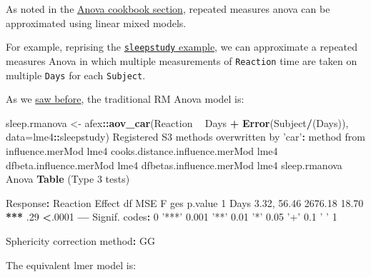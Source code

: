 \documentclass[]{article}
\newenvironment{Shaded}{\begin{snugshade}}{\end{snugshade}}
\newcommand{\DataTypeTok}[1]{\textcolor[rgb]{0.13,0.29,0.53}{#1}}
\newcommand{\DecValTok}[1]{\textcolor[rgb]{0.00,0.00,0.81}{#1}}
\newcommand{\ErrorTok}[1]{\textcolor[rgb]{0.64,0.00,0.00}{\textbf{#1}}}
\newcommand{\FloatTok}[1]{\textcolor[rgb]{0.00,0.00,0.81}{#1}}
\newcommand{\KeywordTok}[1]{\textcolor[rgb]{0.13,0.29,0.53}{\textbf{#1}}}
\newcommand{\NormalTok}[1]{#1}
\newcommand{\OperatorTok}[1]{\textcolor[rgb]{0.81,0.36,0.00}{\textbf{#1}}}
\newcommand{\StringTok}[1]{\textcolor[rgb]{0.31,0.60,0.02}{#1}}
\begin{document}
As noted in the \href{anova-cookbook.html}{Anova cookbook section}, repeated measures
anova can be approximated using linear mixed models.

For example, reprising the \protect\hyperlink{sleepstudy-rmanova}{\texttt{sleepstudy} example}, we can
approximate a repeated measures Anova in which multiple measurements of
\texttt{Reaction} time are taken on multiple \texttt{Days} for each \texttt{Subject}.

As we \protect\hyperlink{sleepstudy-rmanova}{saw before}, the traditional RM Anova model is:

\begin{Shaded}
\begin{Highlighting}[]
\NormalTok{sleep.rmanova <-}\StringTok{ }\NormalTok{afex}\OperatorTok{::}\KeywordTok{aov_car}\NormalTok{(Reaction }\OperatorTok{~}\StringTok{ }\NormalTok{Days }\OperatorTok{+}\StringTok{ }\KeywordTok{Error}\NormalTok{(Subject}\OperatorTok{/}\NormalTok{(Days)), }\DataTypeTok{data=}\NormalTok{lme4}\OperatorTok{::}\NormalTok{sleepstudy)}
\NormalTok{Registered S3 methods overwritten by }\StringTok{'car'}\OperatorTok{:}
\StringTok{  }\NormalTok{method                          from}
\NormalTok{  influence.merMod                lme4}
\NormalTok{  cooks.distance.influence.merMod lme4}
\NormalTok{  dfbeta.influence.merMod         lme4}
\NormalTok{  dfbetas.influence.merMod        lme4}
\NormalTok{sleep.rmanova}
\NormalTok{Anova }\KeywordTok{Table}\NormalTok{ (Type }\DecValTok{3}\NormalTok{ tests)}

\NormalTok{Response}\OperatorTok{:}\StringTok{ }\NormalTok{Reaction}
\NormalTok{  Effect          df     MSE         F ges p.value}
\DecValTok{1}\NormalTok{   Days }\FloatTok{3.32}\NormalTok{, }\FloatTok{56.46} \FloatTok{2676.18} \FloatTok{18.70} \OperatorTok{**}\ErrorTok{*}\StringTok{ }\FloatTok{.29}  \OperatorTok{<}\NormalTok{.}\DecValTok{0001}
\OperatorTok{---}
\NormalTok{Signif. codes}\OperatorTok{:}\StringTok{  }\DecValTok{0} \StringTok{'***'} \FloatTok{0.001} \StringTok{'**'} \FloatTok{0.01} \StringTok{'*'} \FloatTok{0.05} \StringTok{'+'} \FloatTok{0.1} \StringTok{' '} \DecValTok{1}

\NormalTok{Sphericity correction method}\OperatorTok{:}\StringTok{ }\NormalTok{GG }
\end{Highlighting}
\end{Shaded}

The equivalent lmer model is:
\end{document}
